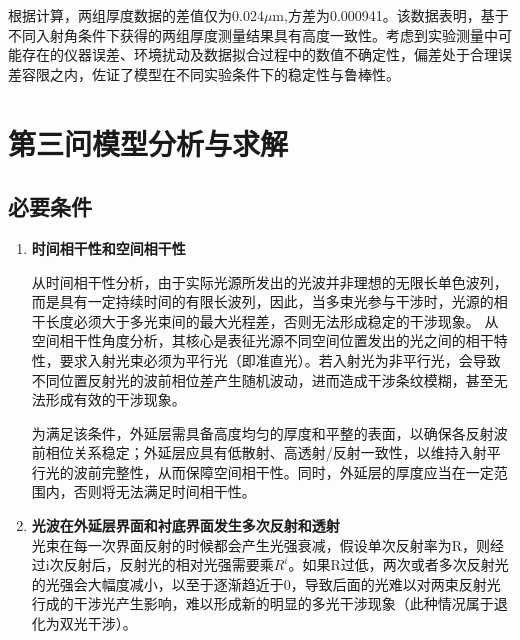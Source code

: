 \documentclass[withoutpreface,bwprint]{cumcmthesis}
\begin{document}
根据计算，两组厚度数据的差值仅为$0.024\mu\mathrm{m}$,方差为0.000941。该数据表明，基于不同入射角条件下获得的两组厚度测量结果具有高度一致性。考虑到实验测量中可能存在的仪器误差、环境扰动及数据拟合过程中的数值不确定性，偏差处于合理误差容限之内，佐证了模型在不同实验条件下的稳定性与鲁棒性。
\section{第三问模型分析与求解}

\subsection{必要条件}

\begin{enumerate}
	\item \textbf{时间相干性和空间相干性} 
	 
	从时间相干性分析，由于实际光源所发出的光波并非理想的无限长单色波列，而是具有一定持续时间的有限长波列，因此，当多束光参与干涉时，光源的相干长度必须大于多光束间的最大光程差，否则无法形成稳定的干涉现象。
	 从空间相干性角度分析，其核心是表征光源不同空间位置发出的光之间的相干特性，要求入射光束必须为平行光（即准直光）。若入射光为非平行光，会导致不同位置反射光的波前相位差产生随机波动，进而造成干涉条纹模糊，甚至无法形成有效的干涉现象。
	
	 为满足该条件，外延层需具备高度均匀的厚度和平整的表面，以确保各反射波前相位关系稳定；外延层应具有低散射、高透射/反射一致性，以维持入射平行光的波前完整性，从而保障空间相干性。同时，外延层的厚度应当在一定范围内，否则将无法满足时间相干性。
	
	\item \textbf{光波在外延层界面和衬底界面发生多次反射和透射}  \\
	光束在每一次界面反射的时候都会产生光强衰减，假设单次反射率为R，则经过i次反射后，反射光的相对光强需要乘$R^i$。如果R过低，两次或者多次反射光的光强会大幅度减小，以至于逐渐趋近于0，导致后面的光难以对两束反射光行成的干涉光产生影响，难以形成新的明显的多光干涉现象（此种情况属于退化为双光干涉）。
		 

\end{enumerate}
\end{document}
